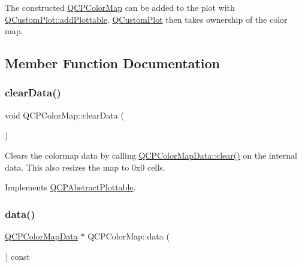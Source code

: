 The constructed \hyperlink{class_q_c_p_color_map}{Q\+C\+P\+Color\+Map} can be added to the plot with \hyperlink{class_q_custom_plot_ab7ad9174f701f9c6f64e378df77927a6}{Q\+Custom\+Plot\+::add\+Plottable}, \hyperlink{class_q_custom_plot}{Q\+Custom\+Plot} then takes ownership of the color map. 

\subsection{Member Function Documentation}
\hypertarget{class_q_c_p_color_map_a0545dce5383766885912331705a8e099}{}\label{class_q_c_p_color_map_a0545dce5383766885912331705a8e099} 
\subsubsection{\texorpdfstring{clear\+Data()}{clearData()}}
{\footnotesize\ttfamily void Q\+C\+P\+Color\+Map\+::clear\+Data (\begin{DoxyParamCaption}{ }\end{DoxyParamCaption})\hspace{0.3cm}{\ttfamily [virtual]}}

Clears the colormap data by calling \hyperlink{class_q_c_p_color_map_data_a9910ba830e96955bd5c8e5bef1e77ef3}{Q\+C\+P\+Color\+Map\+Data\+::clear()} on the internal data. This also resizes the map to 0x0 cells. 

Implements \hyperlink{class_q_c_p_abstract_plottable_a86e5b8fd4b6ff4f4084e7ea4c573fc53}{Q\+C\+P\+Abstract\+Plottable}.

\hypertarget{class_q_c_p_color_map_a047d7eb3ae657f93f2f39b5e68b79451}{}\label{class_q_c_p_color_map_a047d7eb3ae657f93f2f39b5e68b79451} 
\subsubsection{\texorpdfstring{data()}{data()}}
{\footnotesize\ttfamily \hyperlink{class_q_c_p_color_map_data}{Q\+C\+P\+Color\+Map\+Data} $\ast$ Q\+C\+P\+Color\+Map\+::data (\begin{DoxyParamCaption}{ }\end{DoxyParamCaption}) const\hspace{0.3cm}{\ttfamily [inline]}}

